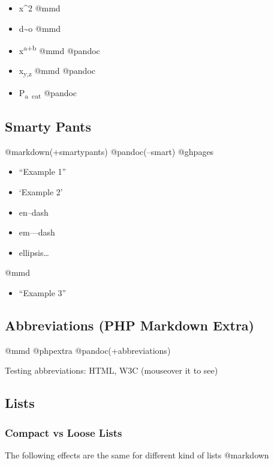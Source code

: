 \documentclass[]{article}
\providecommand{\tightlist}{%
  \setlength{\itemsep}{0pt}\setlength{\parskip}{0pt}}
\begin{document}
\begin{itemize}
\tightlist
\item
  x\^{}2 @mmd
\item
  d\textasciitilde{}o @mmd
\item
  x\textsuperscript{a+b} @mmd @pandoc
\item
  x\textsubscript{y,z} @mmd @pandoc
\item
  P\textsubscript{a~cat} @pandoc
\end{itemize}

\subsection{Smarty Pants}\label{smarty-pants}

@markdown(+smartypants) @pandoc(--smart) @ghpages

\begin{itemize}
\tightlist
\item
  ``Example 1''
\item
  `Example 2'
\item
  en--dash
\item
  em---dash
\item
  ellipsis\ldots{}
\end{itemize}

@mmd

\begin{itemize}
\tightlist
\item
  ``Example 3''
\end{itemize}

\subsection{Abbreviations (PHP Markdown
Extra)}\label{abbreviations-php-markdown-extra}

@mmd @phpextra @pandoc(+abbreviations)

Testing abbreviations: HTML, W3C (mouseover it to see)

\subsection{Lists}\label{lists}

\subsubsection{Compact vs Loose Lists}\label{compact-vs-loose-lists}

The following effects are the same for different kind of lists @markdown
\end{document}
